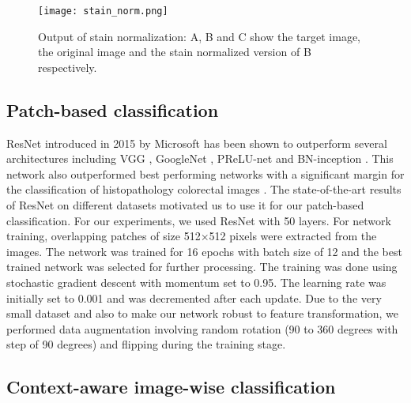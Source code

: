 \documentclass[runningheads,a4paper]{llncs}
\begin{document}
\begin{figure}[ht]
\centering
\texttt{[image: stain\_norm.png]}
\caption{Output of stain normalization: A, B and C show the target image, the original image and the stain normalized version of B respectively.}
\label{fig:example}
\end{figure}

\subsection{Patch-based classification}

ResNet \cite{he2016deep} introduced in 2015 by Microsoft has been shown to outperform several architectures including VGG \cite{simonyan2014very}, GoogleNet \cite{szegedy2015going}, PReLU-net \cite{he2015delving} and BN-inception \cite{ioffe2015batch}. This network also outperformed best performing networks with a significant margin for the classification of histopathology colorectal images \cite{korbar2017deep}. The state-of-the-art results of ResNet on different datasets motivated us to use it for our patch-based classification. For our experiments, we used ResNet with 50 layers. For network training, overlapping patches of size 512$\times$512 pixels were extracted from the images. The network was trained for 16 epochs with batch size of 12 and the best trained network was selected for further processing. The training was done using stochastic gradient descent with momentum set to 0.95. The learning rate was initially set to 0.001 and was decremented after each update. Due to the very small dataset and also to make our network robust to feature transformation, we performed data augmentation involving random rotation (90 to 360 degrees with step of 90 degrees) and flipping during the training stage.
 
\subsection{Context-aware image-wise classification}    
\end{document}
